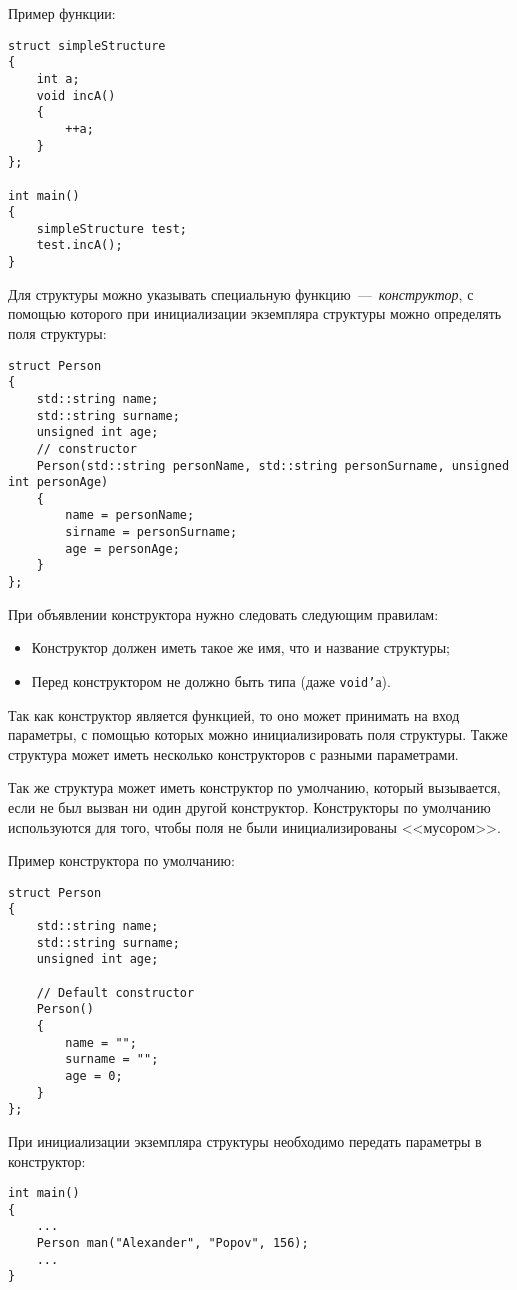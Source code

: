 Пример функции:

\begin{lstlisting}
struct simpleStructure
{
    int a;
    void incA()
    {
        ++a;
    }
};

int main()
{
    simpleStructure test;
    test.incA();
}
\end{lstlisting}

Для структуры можно указывать специальную функцию~---~\emph{конструктор}, с помощью которого при инициализации экземпляра структуры можно определять поля структуры:
\begin{lstlisting}
struct Person
{
    std::string name;
    std::string surname;
    unsigned int age;
    // constructor
    Person(std::string personName, std::string personSurname, unsigned int personAge)
    {
        name = personName;
        sirname = personSurname;
        age = personAge;
    }
};
\end{lstlisting}

При объявлении конструктора нужно следовать следующим правилам:
\begin{itemize}
    \item Конструктор должен иметь такое же имя, что и название структуры;
    \item Перед конструктором не должно быть типа (даже \texttt{void'}а).
\end{itemize}

Так как конструктор является функцией, то оно может принимать на вход параметры, с помощью которых можно инициализировать поля структуры. Также структура может иметь несколько конструкторов с разными параметрами.

Так же структура может иметь конструктор по умолчанию, который вызывается, если не был вызван ни один другой конструктор. Конструкторы по умолчанию используются для того, чтобы поля не были инициализированы <<мусором>>.

Пример конструктора по умолчанию:
\begin{lstlisting}
struct Person
{
    std::string name;
    std::string surname;
    unsigned int age;

    // Default constructor
    Person()
    {
        name = "";
        surname = "";
        age = 0;
    }
};
\end{lstlisting}


При инициализации экземпляра структуры необходимо передать параметры в конструктор:
\begin{lstlisting}
int main()
{
    ...
    Person man("Alexander", "Popov", 156);
    ...
}
\end{lstlisting}

